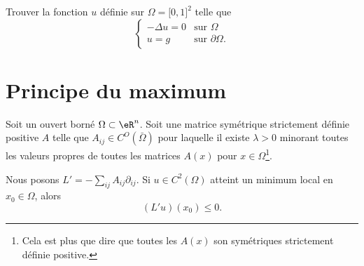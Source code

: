 \begin{example}
    Trouver la fonction \( u\) définie sur \( \Omega= \mathopen[ 0 , 1 \mathclose]^2\) telle que
    \begin{equation}
        \begin{cases}
            -\Delta u=0    &   \text{sur } \Omega\\
            u=g    &    \text{sur }\partial \Omega.
        \end{cases}
    \end{equation}

\end{example}

\section{Principe du maximum}

\begin{lemma}        \label{LEMooSPVUooDQOeom}
    Soit un ouvert borné \( \Omega\subset \eR^n\). Soit une matrice symétrique strictement définie positive \( A\) telle que \( A_{ij}\in C^O(\bar \Omega)\) pour laquelle il existe \( \lambda>0\) minorant toutes les valeurs propres de toutes les matrices \( A(x)\) pour \( x\in \Omega\)\footnote{Cela est plus que dire que toutes les \( A(x)\) son symétriques strictement définie positive.}.

    Nous posons \( L'=-\sum_{ij}A_{ij}\partial_{ij}\). Si \( u\in C^2(\Omega)\) atteint un minimum local en \( x_0\in \Omega\), alors
    \begin{equation}
        (L'u)(x_0)\leq 0.
    \end{equation}
\end{lemma}

